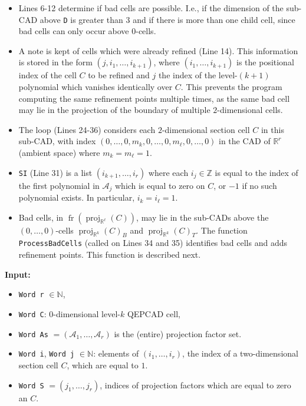 \documentclass[
]{book}
\providecommand{\tightlist}{%
  \setlength{\itemsep}{0pt}\setlength{\parskip}{0pt}}
\theoremstyle{definition}
\theoremstyle{definition}
\theoremstyle{definition}
\theoremstyle{definition}
\theoremstyle{remark}
\begin{document}
\begin{itemize}
\tightlist
\item
  Lines 6-12 determine if bad cells are possible. I.e., if the dimension of the sub-CAD above \texttt{D} is greater than \(3\) and if there is more than one child cell, since bad cells can only occur above \(0\)-cells.
\item
  A note is kept of cells which were already refined (Line 14). This information is stored in the form \((j,i_1,\ldots,i_{k+1})\), where \((i_1,\ldots,i_{k+1})\) is the positional index of the cell \(C\) to be refined and \(j\) the index of the level-\((k+1)\) polynomial which vanishes identically over \(C\). This prevents the program computing the same refinement points multiple times, as the same bad cell may lie in the projection of the boundary of multiple \(2\)-dimensional cells.
\item
  The loop (Lines 24-36) considers each \(2\)-dimensional section cell \(C\) in this sub-CAD, with index \((0,\ldots,0,m_k,0,\ldots,0,m_\ell,0,\ldots,0)\) in the CAD of \(\mathbb{R}^r\) (ambient space) where \(m_k=m_\ell = 1\).
\item
  \texttt{SI} (Line 31) is a list \((i_{k+1},\ldots,i_r)\) where each \(i_j \in \mathbb{Z}\) is equal to the index of the first polynomial in \(\mathcal{A}_j\) which is equal to zero on \(C\), or \(-1\) if no such polynomial exists. In particular, \(i_k = i_\ell = 1\).
\item
  Bad cells, in \({\operatorname{fr} \left( {\operatorname{proj}_{\mathbb{R}^{\ell}}}(C) \right)}\), may lie in the sub-CADs above the \((0,\ldots,0)\)-cells \({\operatorname{proj}_{\mathbb{R}^{k}}}(C)_B\) and \({\operatorname{proj}_{\mathbb{R}^{k}}}(C)_T\). The function \texttt{ProcessBadCells} (called on Lines 34 and 35) identifies bad cells and adds refinement points. This function is described next.
\end{itemize}

\textbf{Input:}

\begin{itemize}
\tightlist
\item
  \texttt{Word\ r} \(\in \mathbb{N}\),
\item
  \texttt{Word\ C}: \(0\)-dimensional level-\(k\) QEPCAD cell,
\item
  \texttt{Word\ As} \(= (\mathcal{A}_1,\ldots,\mathcal{A}_r)\) is the (entire) projection factor set.
\item
  \texttt{Word\ i}, \texttt{Word\ j} \(\in \mathbb{N}\): elements of \((i_1,\ldots,i_r)\), the index of a two-dimensional section cell \(C\), which are equal to \(1\).
\item
  \texttt{Word\ S} \(= (j_1,\ldots,j_r)\), indices of projection factors which are equal to zero an \(C\).
\end{itemize}
\end{document}
